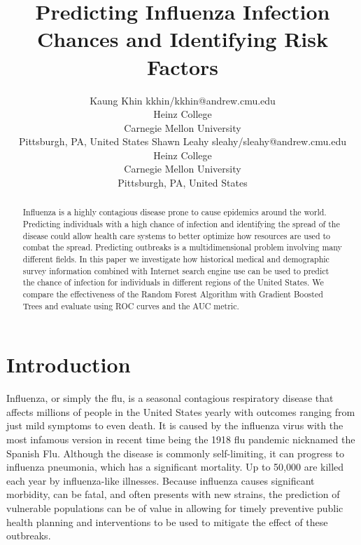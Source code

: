 \documentclass[twoside,11pt]{article}
\begin{document}
\title{Predicting Influenza Infection Chances and Identifying Risk Factors}

\author{\name Kaung Khin \email kkhin/kkhin@andrew.cmu.edu \\
       \addr Heinz College\\
       Carnegie Mellon University\\
       Pittsburgh, PA, United States
       \AND
       \name Shawn Leahy \email sleahy/sleahy@andrew.cmu.edu \\
       \addr Heinz College\\
       Carnegie Mellon University\\
       Pittsburgh, PA, United States}

\maketitle

\begin{abstract}
Influenza is a highly contagious disease prone to cause epidemics around the world.  Predicting individuals with a high chance of infection and identifying the spread of the disease could allow health care systems to better optimize how resources are used to combat the spread.  Predicting outbreaks is a multidimensional problem involving many different fields.  In this paper we investigate how historical medical and demographic survey information combined with Internet search engine use can be used to predict the chance of infection for individuals in different regions of the United States.  We compare the effectiveness of the Random Forest Algorithm with Gradient Boosted Trees and evaluate using ROC curves and the AUC metric.    
\end{abstract}

\section{Introduction}
Influenza, or simply the flu, is a seasonal contagious respiratory disease that
affects millions of people in the United States yearly with outcomes ranging
from just mild symptoms to even death. \citep{cdc} It is caused by the influenza virus with the most infamous version in recent time being the 1918 flu pandemic nicknamed the Spanish Flu. \citep{rolfes_etal_2017} Although the disease is commonly self-limiting, it can progress to influenza pneumonia, which has a significant mortality. Up to 50,000 are killed each year by influenza-like illnesses.  Because influenza causes significant morbidity, can be fatal, and often presents with new strains, the prediction of vulnerable populations can be of value in allowing for timely preventive public health planning and interventions to be used to mitigate the effect of these outbreaks.     
\end{document}
